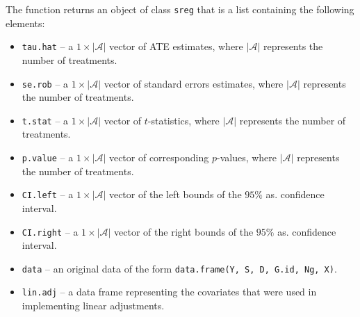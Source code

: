 \documentclass{article}
\begin{document}
The function returns an object of class \texttt{sreg} that is a list containing the following elements:
\begin{itemize}
\item \texttt{tau.hat} -- a $1 \times |\mathcal A|$ vector of ATE estimates, where $|\mathcal A|$ represents the number of treatments.
\item \texttt{se.rob} -- a $1 \times |\mathcal A|$ vector of standard errors estimates, where $|\mathcal A|$ represents the number of treatments.
\item \texttt{t.stat} -- a $1 \times |\mathcal A|$ vector of $t$-statistics, where $|\mathcal A|$ represents the number of treatments.
\item \texttt{p.value} -- a $1 \times |\mathcal A|$ vector of corresponding $p$-values, where $|\mathcal A|$ represents the number of treatments.
\item \texttt{CI.left} -- a $1 \times |\mathcal A|$ vector of the left bounds of the $95\%$ as. confidence interval.
\item \texttt{CI.right} -- a $1 \times |\mathcal A|$ vector of the right bounds of the $95\%$ as. confidence interval.
\item \texttt{data} -- an original data of the form \texttt{data.frame(Y, S, D, G.id, Ng, X)}.
\item \texttt{lin.adj} -- a data frame representing the covariates that were used in implementing linear adjustments.
\end{itemize}
\end{document}

